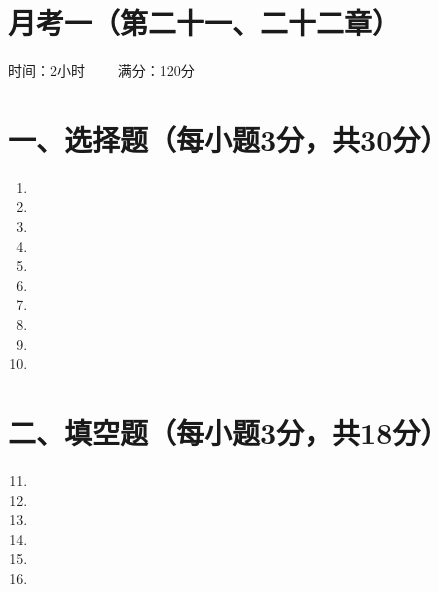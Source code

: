 \documentclass[10pt]{article}
\begin{document}
\section*{\centering 月考一（第二十一、二十二章）}
\centerline{时间：2小时 \ \ \ \ 满分：120分}
\section*{\normalsize 一、选择题（每小题3分，共30分）}
\begin{enumerate}\setcounter{enumi}{0}
    \item %
    \item %
    \item %
    \item %
    \item %
    \item %
    \item %
    \item %
    \item %
    \item %
\end{enumerate}
\section*{\normalsize 二、填空题（每小题3分，共18分）}
\begin{enumerate}\setcounter{enumi}{10}
    \item %
    \item %
    \item %
    \item %
    \item %
    \item %
\end{enumerate}
\end{document}

